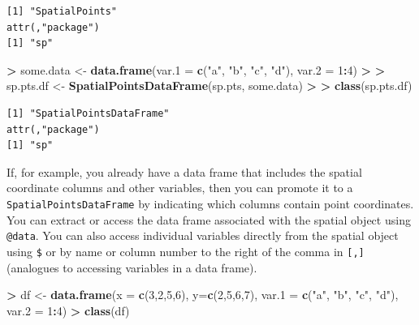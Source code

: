 \documentclass[]{krantz}
\makeatletter
\newenvironment{Shaded}{\begin{snugshade}}{\end{snugshade}}
\newcommand{\KeywordTok}[1]{\textcolor[rgb]{0.27,0.27,0.27}{\textbf{#1}}}
\newcommand{\DataTypeTok}[1]{\textcolor[rgb]{0.27,0.27,0.27}{#1}}
\newcommand{\DecValTok}[1]{\textcolor[rgb]{0.06,0.06,0.06}{#1}}
\newcommand{\StringTok}[1]{\textcolor[rgb]{0.5,0.5,0.5}{#1}}
\newcommand{\OperatorTok}[1]{\textcolor[rgb]{0.43,0.43,0.43}{\textbf{#1}}}
\newcommand{\ErrorTok}[1]{\textcolor[rgb]{0.14,0.14,0.14}{\textbf{#1}}}
\newcommand{\NormalTok}[1]{#1}
\newenvironment{kframe}{%
\medskip{}
\setlength{\fboxsep}{.8em}
 \def\at@end@of@kframe{}%
 \ifinner\ifhmode%
  \def\at@end@of@kframe{\end{minipage}}%
  \begin{minipage}{\columnwidth}%
 \fi\fi%
 \def\FrameCommand##1{\hskip\@totalleftmargin \hskip-\fboxsep
 \colorbox{shadecolor}{##1}\hskip-\fboxsep
     \hskip-\linewidth \hskip-\@totalleftmargin \hskip\columnwidth}%
 \MakeFramed {\advance\hsize-\width
   \@totalleftmargin\z@ \linewidth\hsize
   \@setminipage}}%
 {\par\unskip\endMakeFramed%
 \at@end@of@kframe}
\renewenvironment{Shaded}{\begin{kframe}}{\end{kframe}}
\makeatother
\begin{document}
\begin{verbatim}
[1] "SpatialPoints"
attr(,"package")
[1] "sp"
\end{verbatim}

\begin{Shaded}
\begin{Highlighting}[]
\OperatorTok{>}\StringTok{ }\NormalTok{some.data <-}\StringTok{ }\KeywordTok{data.frame}\NormalTok{(}\DataTypeTok{var.1 =} \KeywordTok{c}\NormalTok{(}\StringTok{"a"}\NormalTok{, }\StringTok{"b"}\NormalTok{, }\StringTok{"c"}\NormalTok{, }\StringTok{"d"}\NormalTok{), }\DataTypeTok{var.2 =} \DecValTok{1}\OperatorTok{:}\DecValTok{4}\NormalTok{)}
\OperatorTok{>}\StringTok{ }
\ErrorTok{>}\StringTok{ }\NormalTok{sp.pts.df <-}\StringTok{ }\KeywordTok{SpatialPointsDataFrame}\NormalTok{(sp.pts, some.data)}
\OperatorTok{>}\StringTok{ }
\ErrorTok{>}\StringTok{ }\KeywordTok{class}\NormalTok{(sp.pts.df)}
\end{Highlighting}
\end{Shaded}

\begin{verbatim}
[1] "SpatialPointsDataFrame"
attr(,"package")
[1] "sp"
\end{verbatim}

If, for example, you already have a data frame that includes the spatial
coordinate columns and other variables, then you can promote it to a
\texttt{SpatialPointsDataFrame} by indicating which columns contain
point coordinates. You can extract or access the data frame associated
with the spatial object using \texttt{@data}. You can also access
individual variables directly from the spatial object using \texttt{\$}
or by name or column number to the right of the comma in
\texttt{{[},{]}} (analogues to accessing variables in a data frame).

\begin{Shaded}
\begin{Highlighting}[]
\OperatorTok{>}\StringTok{ }\NormalTok{df <-}\StringTok{ }\KeywordTok{data.frame}\NormalTok{(}\DataTypeTok{x =} \KeywordTok{c}\NormalTok{(}\DecValTok{3}\NormalTok{,}\DecValTok{2}\NormalTok{,}\DecValTok{5}\NormalTok{,}\DecValTok{6}\NormalTok{), }\DataTypeTok{y=}\KeywordTok{c}\NormalTok{(}\DecValTok{2}\NormalTok{,}\DecValTok{5}\NormalTok{,}\DecValTok{6}\NormalTok{,}\DecValTok{7}\NormalTok{), }\DataTypeTok{var.1 =} \KeywordTok{c}\NormalTok{(}\StringTok{"a"}\NormalTok{, }\StringTok{"b"}\NormalTok{, }\StringTok{"c"}\NormalTok{, }\StringTok{"d"}\NormalTok{), }\DataTypeTok{var.2 =} \DecValTok{1}\OperatorTok{:}\DecValTok{4}\NormalTok{)}
\OperatorTok{>}\StringTok{ }\KeywordTok{class}\NormalTok{(df)}
\end{Highlighting}
\end{Shaded}
\end{document}
